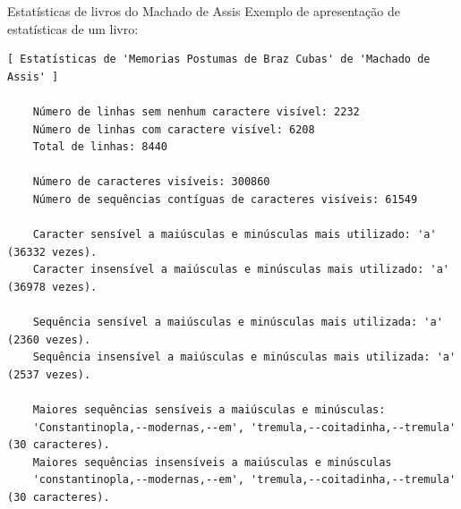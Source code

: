 \documentclass[12pt]{beamer}
\begin{document}
\begin{frame}[fragile]{Estatísticas de livros do Machado de Assis}
  Exemplo de apresentação de estatísticas de um livro:

  \tiny{\begin{verbatim}[ Estatísticas de 'Memorias Postumas de Braz Cubas' de 'Machado de Assis' ]

    Número de linhas sem nenhum caractere visível: 2232
    Número de linhas com caractere visível: 6208
    Total de linhas: 8440

    Número de caracteres visíveis: 300860
    Número de sequências contíguas de caracteres visíveis: 61549

    Caracter sensível a maiúsculas e minúsculas mais utilizado: 'a' (36332 vezes).
    Caracter insensível a maiúsculas e minúsculas mais utilizado: 'a' (36978 vezes).

    Sequência sensível a maiúsculas e minúsculas mais utilizada: 'a' (2360 vezes).
    Sequência insensível a maiúsculas e minúsculas mais utilizada: 'a' (2537 vezes).

    Maiores sequências sensíveis a maiúsculas e minúsculas:
    'Constantinopla,--modernas,--em', 'tremula,--coitadinha,--tremula' (30 caracteres).
    Maiores sequências insensíveis a maiúsculas e minúsculas
    'constantinopla,--modernas,--em', 'tremula,--coitadinha,--tremula' (30 caracteres).\end{verbatim}}
\end{frame}
\end{document}
